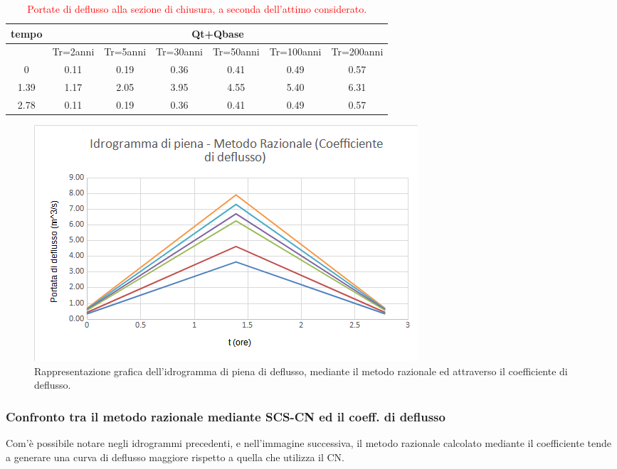 \begin{table}[H] \centering
    \caption{\textcolor{red}{Portate di deflusso alla sezione di chiusura, a seconda dell'attimo considerato.}}
    \begin{tabular}{ccccccc}
        \toprule
    tempo & \multicolumn{6}{c}{Qt+Qbase}    \\
    \midrule
& Tr=2anni & Tr=5anni & Tr=30anni & Tr=50anni & Tr=100anni & Tr=200anni \\
    0                      & 0.11     & 0.19     & 0.36      & 0.41      & 0.49       & 0.57       \\
    1.39                   & 1.17     & 2.05     & 3.95      & 4.55      & 5.40       & 6.31       \\
    2.78                   & 0.11     & 0.19     & 0.36      & 0.41      & 0.49       & 0.57 \\
    \bottomrule     
    \end{tabular}
\end{table}

\begin{figure}[H]  \centering
    \includegraphics[scale=0.75]{immagini/metodo_razionale_coefficiente_deflusso.png}
    \caption{Rappresentazione grafica dell'idrogramma di piena di deflusso, mediante il metodo razionale ed attraverso il coefficiente di deflusso.}
    \label{metodo_razionale_coefficiete_deflusso}
\end{figure}

\subsubsection{Confronto tra il metodo razionale mediante SCS-CN ed il coeff. di deflusso}
Com'è possibile notare negli idrogrammi precedenti, e nell'immagine successiva, il metodo razionale calcolato mediante il coefficiente tende a generare una curva di deflusso maggiore rispetto a quella che utilizza il CN.

